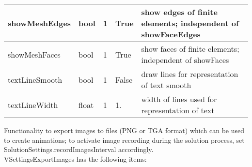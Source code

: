 \begin{center}
\begin{longtable}{| p{4.2cm} | p{2.5cm} | p{0.3cm} | p{3.0cm} | p{6cm} |}
    showMeshEdges &     bool &     1 &     True &     show edges of finite elements; independent of showFaceEdges\\ \hline
    showMeshFaces &     bool &     1 &     True &     show faces of finite elements; independent of showFaces\\ \hline
    textLineSmooth &     bool &     1 &     False &     draw lines for representation of text smooth\\ \hline
    textLineWidth &     float &     1 &     1. &     width of lines used for representation of text\\ \hline
	  \end{longtable}
	\end{center}

 \label{sec:VSettingsExportImages}
Functionality to export images to files (PNG or TGA format) which can be used to create animations; to activate image recording during the solution process, set SolutionSettings.recordImagesInterval accordingly.\\ 
%
VSettingsExportImages has the following items:
